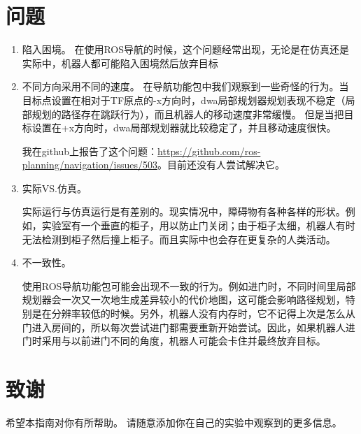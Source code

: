 \section[Problems]{问题}%

\begin{enumerate}
	\item 陷入困境。 %
	在使用ROS导航的时候，这个问题经常出现，无论是在仿真还是实际中，机器人都可能陷入困境然后放弃目标
	
	\item 不同方向采用不同的速度。%
	在导航功能包中我们观察到一些奇怪的行为。当目标点设置在相对于TF原点的-x方向时，dwa局部规划器规划表现不稳定（局部规划的路径存在跳跃行为），而且机器人的移动速度非常缓慢。
	但是当把目标设置在+x方向时，dwa局部规划器就比较稳定了，并且移动速度很快。
	
	我在github上报告了这个问题：\url{https://github.com/ros-planning/navigation/issues/503}。目前还没有人尝试解决它。
	
	\item 实际VS.仿真。 %
	
	实际运行与仿真运行是有差别的。现实情况中，障碍物有各种各样的形状。例如，实验室有一个垂直的柜子，用以防止门关闭；由于柜子太细，机器人有时无法检测到柜子然后撞上柜子。而且实际中也会存在更复杂的人类活动。
	
	\item 不一致性。%
	
	使用ROS导航功能包可能会出现不一致的行为。例如进门时，不同时间里局部规划器会一次又一次地生成差异较小的代价地图，这可能会影响路径规划，特别是在分辨率较低的时候。另外，机器人没有内存时，它不记得上次是怎么从门进入房间的，所以每次尝试进门都需要重新开始尝试。因此，如果机器人进门时采用与以前进门不同的角度，机器人可能会卡住并最终放弃目标。
	
\end{enumerate}


\section*{致谢}
希望本指南对你有所帮助。 请随意添加你在自己的实验中观察到的更多信息。
